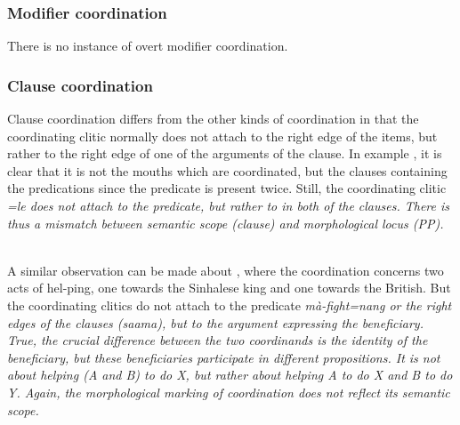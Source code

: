 \subsubsection[Modifier]{Modifier coordination}\label{sec:constr:Modifiercoordination}
There is no instance of overt modifier coordination.

\subsubsection[Clause]{Clause coordination}\label{sec:constr:Clausecoordination}
Clause coordination differs from the other kinds of coordination in that the coordinating clitic normally does not attach to the right edge of the items, but rather to the right edge of one of the arguments of the clause. In example , it is clear that it is not the mouths which are coordinated, but the clauses containing the predications since the predicate  is present twice. Still, the coordinating clitic \em =le \em does not attach to the predicate, but rather to  in both of the clauses. There is thus a mismatch between semantic scope (clause) and morphological locus (PP).

\\ 

A similar observation can be made about , where the coordination concerns two acts of hel-ping, one towards the Sinhalese king and one towards the British. But the coordinating clitics do not attach to the predicate \em mà-fight=nang \em or  the right edges of the clauses (\em saama\em), but to the argument expressing the beneficiary. True, the crucial difference between the two coordinands is the identity of the beneficiary, but these beneficiaries participate in different propositions. It is not about helping (A and B) to do X, but rather about helping A to do X and B to do Y. Again, the morphological marking of coordination does not reflect its semantic scope.

